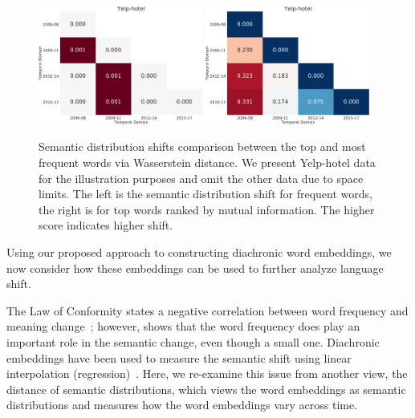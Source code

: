 \begin{figure}[tb!]
\centering
\includegraphics[width=0.48\textwidth]{images/chapter3/sm_shift/yelp_hotel_year_freq.pdf}
\includegraphics[width=0.48\textwidth]{images/chapter3/sm_shift/yelp_hotel_year_mi.pdf}
\caption{Semantic distribution shifts comparison between the top and most frequent words via Wasserstein distance. We present Yelp-hotel data for the illustration purposes and omit the other data due to space limits. The left is the semantic distribution shift for frequent words, the right is for top words ranked by mutual information. The higher score indicates higher shift.}
\label{chap3:fig:sm_shift}
\end{figure}

Using our proposed approach to constructing diachronic word embeddings,
we now consider how these embeddings can be used to further analyze language shift.

The Law of Conformity states a negative correlation between word frequency and meaning change~\cite{hamilton2016diachronic}; however, \cite{dubossarsky2017outta} shows that the word frequency does play an important role in the semantic change, even though a small one. 
Diachronic embeddings have been used to measure the semantic shift using linear interpolation (regression)~\cite{hamilton2016diachronic}. 
Here, we re-examine this issue from another view, the distance of semantic distributions, which views the word embeddings as semantic distributions and measures how the word embeddings vary across time.

